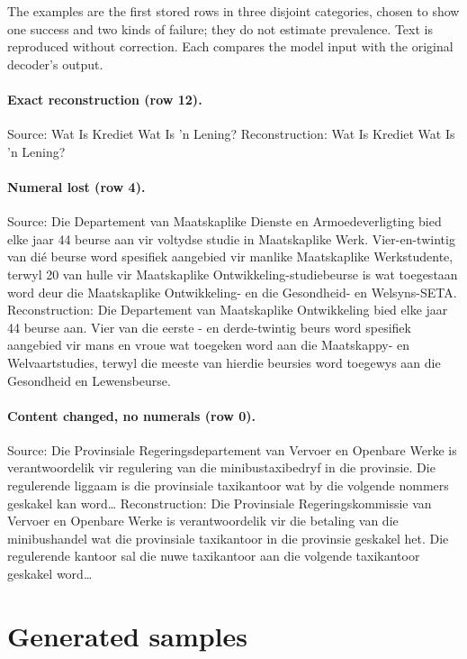 \documentclass[11pt,a4paper]{article}
\begin{document}
The examples are the first stored rows in three disjoint categories, chosen to show one success and two kinds of failure; they do not estimate prevalence. Text is reproduced without correction. Each compares the model input with the original decoder's output.

\paragraph{Exact reconstruction (row 12).} Source: Wat Is Krediet Wat Is 'n Lening? Reconstruction: Wat Is Krediet Wat Is 'n Lening?

\paragraph{Numeral lost (row 4).} Source: Die Departement van Maatskaplike Dienste en Armoedeverligting bied elke jaar 44 beurse aan vir voltydse studie in Maatskaplike Werk. Vier-en-twintig van di\'e beurse word spesifiek aangebied vir manlike Maatskaplike Werkstudente, terwyl 20 van hulle vir Maatskaplike Ontwikkeling-studiebeurse is wat toegestaan word deur die Maatskaplike Ontwikkeling- en die Gesondheid- en Welsyns-SETA. Reconstruction: Die Departement van Maatskaplike Ontwikkeling bied elke jaar 44 beurse aan. Vier van die eerste - en derde-twintig beurs word spesifiek aangebied vir mans en vroue wat toegeken word aan die Maatskappy- en Welvaartstudies, terwyl die meeste van hierdie beursies word toegewys aan die Gesondheid en Lewensbeurse.

\paragraph{Content changed, no numerals (row 0).} Source: Die Provinsiale Regeringsdepartement van Vervoer en Openbare Werke is verantwoordelik vir regulering van die minibustaxibedryf in die provinsie. Die regulerende liggaam is die provinsiale taxikantoor wat by die volgende nommers geskakel kan word\ldots{} Reconstruction: Die Provinsiale Regeringskommissie van Vervoer en Openbare Werke is verantwoordelik vir die betaling van die minibushandel wat die provinsiale taxikantoor in die provinsie geskakel het. Die regulerende kantoor sal die nuwe taxikantoor aan die volgende taxikantoor geskakel word\ldots{}

\section{Generated samples}
\label{app:samples}
\end{document}
